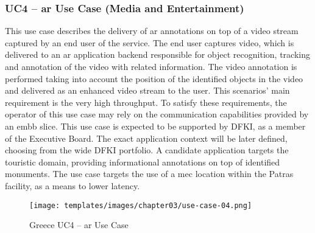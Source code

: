 	\subsubsection{UC4 – \acrshort{ar} Use Case (Media and Entertainment)}
	This use case describes the delivery of \acrshort{ar} annotations on top of a video stream captured by an end user of the service. The end user captures video, which is delivered to an \acrshort{ar} application backend responsible for object recognition, tracking and annotation of the video with related information. The video annotation is performed taking into account the position of the identified objects in the video and delivered as an enhanced video stream to the user. This scenarios’ main requirement is the very high throughput. To satisfy these requirements, the operator of this use case may rely on the communication capabilities provided by an \acrshort{embb} slice. This use case is expected to be supported by DFKI, as a member of the Executive Board. The exact application context will be later defined, choosing from the wide DFKI portfolio. A candidate application targets the touristic domain, providing informational annotations on top of identified monuments. The use case targets the use of a \acrshort{mec} location within the Patras facility, as a means to lower latency. 
\medskip
    \begin{figure}[!ht]
        \centering
        \texttt{[image: templates/images/chapter03/use-case-04.png]}
        \caption{Greece UC4 – \acrshort{ar} Use Case}
        \label{fig:uc4}
    \end{figure}